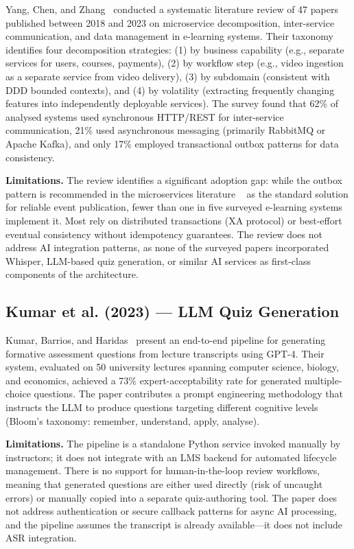 Yang, Chen, and Zhang~\cite{yang2023micro} conducted a systematic literature review of 47 papers published between 2018 and 2023 on microservice decomposition, inter-service communication, and data management in e-learning systems. Their taxonomy identifies four decomposition strategies: (1) by business capability (e.g., separate services for users, courses, payments), (2) by workflow step (e.g., video ingestion as a separate service from video delivery), (3) by subdomain (consistent with DDD bounded contexts), and (4) by volatility (extracting frequently changing features into independently deployable services). The survey found that 62\% of analysed systems used synchronous HTTP/REST for inter-service communication, 21\% used asynchronous messaging (primarily RabbitMQ or Apache Kafka), and only 17\% employed transactional outbox patterns for data consistency.

\textbf{Limitations.} The review identifies a significant adoption gap: while the outbox pattern is recommended in the microservices literature ~\cite{richardson2018outbox} as the standard solution for reliable event publication, fewer than one in five surveyed e-learning systems implement it. Most rely on distributed transactions (XA protocol) or best-effort eventual consistency without idempotency guarantees. The review does not address AI integration patterns, as none of the surveyed papers incorporated Whisper, LLM-based quiz generation, or similar AI services as first-class components of the architecture.

\subsection{Kumar et al. (2023) --- LLM Quiz Generation}

Kumar, Barrios, and Haridas~\cite{kumar2023llmquiz} present an end-to-end pipeline for generating formative assessment questions from lecture transcripts using GPT-4. Their system, evaluated on 50 university lectures spanning computer science, biology, and economics, achieved a 73\% expert-acceptability rate for generated multiple-choice questions. The paper contributes a prompt engineering methodology that instructs the LLM to produce questions targeting different cognitive levels (Bloom's taxonomy: remember, understand, apply, analyse).

\textbf{Limitations.} The pipeline is a standalone Python service invoked manually by instructors; it does not integrate with an LMS backend for automated lifecycle management. There is no support for human-in-the-loop review workflows, meaning that generated questions are either used directly (risk of uncaught errors) or manually copied into a separate quiz-authoring tool. The paper does not address authentication or secure callback patterns for async AI processing, and the pipeline assumes the transcript is already available---it does not include ASR integration.

